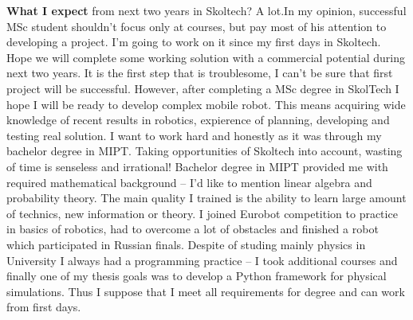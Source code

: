 \documentclass[11pt,a4paper,roman]{moderncv}        %
\begin{document}
\newline
\newline 
\textbf{What I expect} from next two years in Skoltech? A lot.\newline In my opinion, successful MSc student shouldn't focus only at courses, but pay most of his attention to developing a project. I'm going to work on it since my first days in Skoltech. Hope we will complete some working solution with a commercial potential during next two years. It is the first step that is troublesome, I can't be sure that first project will be successful. However, after completing a MSc degree in SkolTech I hope I will be ready to develop complex mobile robot. This means acquiring wide knowledge of recent results in robotics, expierence of planning, developing and testing real solution. I want to work hard and honestly as it was through my bachelor degree in MIPT. Taking opportunities of Skoltech into account, wasting of time is senseless and irrational! 
\newline
\newline
Bachelor degree in MIPT provided me with required mathematical background -- I'd like to mention linear algebra and probability theory. The main quality I trained is the ability to learn large amount of technics, new information or theory. I joined Eurobot competition to practice in basics of robotics, had to overcome a lot of obstacles and finished a robot which participated in Russian finals. Despite of studing mainly physics in University I always had a programming practice  -- I took additional courses and finally one of my thesis goals was to develop a Python framework for physical simulations. Thus I suppose that I meet all requirements for degree and can work from first days.


\makeletterclosing
\end{document}
